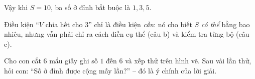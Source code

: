 {Vậy khi $S = 10$, ba số ở đỉnh bắt buộc là $1, 3, 5$.
\begin{warnbox}Điều kiện ``$V$ chia hết cho $3$'' chỉ là điều kiện \emph{cần}: nó cho biết $S$ \emph{có thể} bằng bao nhiêu, nhưng
vẫn phải chỉ ra cách điền cụ thể (câu b) và kiểm tra từng bộ (câu c).\end{warnbox}
\begin{parentbox}Cho con cắt $6$ mẩu giấy ghi số $1$ đến $6$ và xếp thử trên hình vẽ. Sau vài lần thử, hỏi con: ``Số ở đỉnh được
cộng mấy lần?'' -- đó là ý chính của lời giải.\end{parentbox}
}
